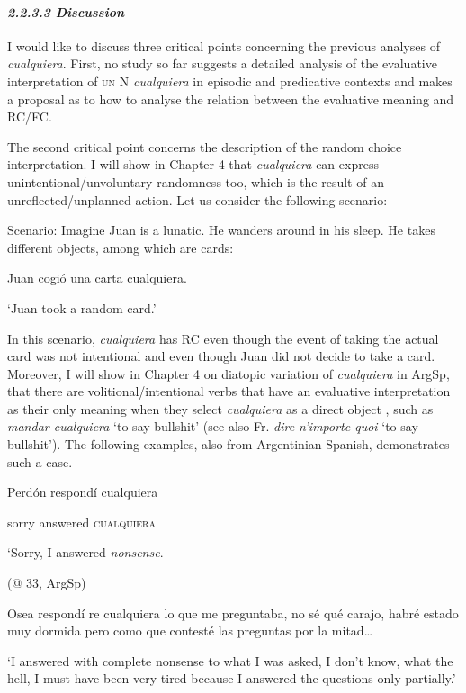 \paragraph{\textit{2.2.3.3 Discussion}}

I would like to discuss three critical points concerning the previous analyses of \textit{cualquiera}. First, no study so far suggests a detailed analysis of the evaluative interpretation of \textsc{un} N \textit{cualquiera} in episodic and predicative contexts and makes a proposal as to how to analyse the relation between the evaluative meaning and RC/FC. 

  The second critical point concerns the description of the random choice interpretation. I will show in Chapter 4 that \textit{cualquiera} can express unintentional/unvoluntary randomness too, which is the result of an unreflected/unplanned action. Let us consider the following scenario:

  Scenario: Imagine Juan is a lunatic. He wanders around in his sleep. He takes different objects, among which are cards:

  Juan cogió una carta cualquiera.

  ‘Juan took a random card.’

In this scenario, \textit{cualquiera} has RC even though the event of taking the actual card was not intentional and even though Juan did not decide to take a card. Moreover, I will show in Chapter 4 on diatopic variation of \textit{cualquiera} in ArgSp, that there are volitional/intentional verbs that have an evaluative interpretation as their only meaning when they select \textit{cualquiera} as a direct object , such as \textit{mandar cualquiera} ‘to say bullshit’ (see also Fr. \textit{dire n’importe quoi} ‘to say bullshit’). The following examples, also from Argentinian Spanish, demonstrates such a case.

  Perdón  respondí  cualquiera  

  sorry  answered  \textsc{cualquiera}

  ‘Sorry, I answered \textit{nonsense}. 

  (@ 33,  ArgSp)

  Osea respondí re cualquiera lo que me preguntaba, no sé qué carajo, habré estado muy dormida pero como que contesté las preguntas por la mitad… 

  ‘I answered with complete nonsense to what I was asked, I don’t know, what the hell, I must have been very tired because I answered the questions only partially.’

